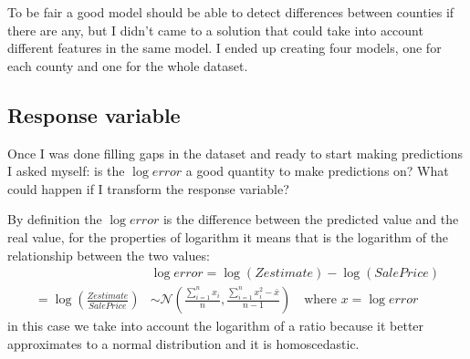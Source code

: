 To be fair a good model should be able to detect differences between counties if there are any, but I didn't came to a solution that could take into account different features in the same model. I ended up creating four models, one for each county and one for the whole dataset.

\subsection{Response variable}

Once I was done filling gaps in the dataset and ready to start making predictions I asked myself: is the $\log{error}$ a good quantity to make predictions on? What could happen if I transform the response variable?

By definition the $\log{error}$ is the difference between the predicted value and the real value, for the properties of logarithm it means that is the logarithm of the relationship between the two values:
$$
\begin{aligned}
    &\log error = \log(Zestimate) - \log(SalePrice)\\
    = \log{\left(\frac{Zestimate}{SalePrice}\right)} &\sim
    \mathcal{N}\left(\frac{\sum_{i=1}^n x_i}{n}, \frac{\sum_{i=1}^n x_i^2 - \bar {x}} {n-1}\right)\quad\text{where }x = \log error 
\end{aligned}
$$
in this case we take into account the logarithm of a ratio because it better approximates to a normal distribution and it is homoscedastic.

